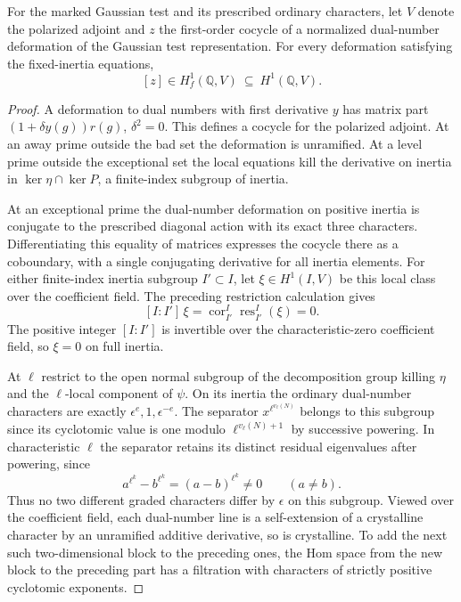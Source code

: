 \begin{lemma}\label{lem:gaussian-fixed-inertia-finite}
For the marked Gaussian test and its prescribed ordinary
characters, let \(V\) denote the polarized adjoint and \(z\) the first-order
cocycle of a normalized dual-number deformation of the Gaussian test
representation. For every deformation satisfying the fixed-inertia equations,
\[
                       [z]\in H_f^1(\mathbb Q,V)
                              \ \subseteq\ H^1(\mathbb Q,V).
\]
\end{lemma}

\begin{proof}
A deformation to dual numbers with first derivative \(y\)
has matrix part \((1+\delta y(g))r(g)\), \(\delta^2=0\).
This defines a cocycle for the polarized adjoint. At an
away prime outside the bad set the deformation is
unramified. At a level prime outside the exceptional set the
local equations kill the derivative on inertia in
\(\ker\eta\cap\ker P\), a finite-index subgroup of inertia.

At an exceptional prime the dual-number deformation on
positive inertia is conjugate to the prescribed diagonal
action with its exact three characters. Differentiating
this equality of matrices expresses the cocycle there
as a coboundary, with a single conjugating derivative
for all inertia elements. For either finite-index inertia subgroup \(I'\subset I\), let
\(\xi\in H^1(I,V)\) be this local class over the coefficient field.
The preceding restriction calculation gives
\[
 [I:I']\,\xi
 =\operatorname{cor}_{I'}^I\operatorname{res}_{I'}^I(\xi)=0 .
\]
The positive integer \([I:I']\) is invertible over the characteristic-zero
coefficient field, so \(\xi=0\) on full inertia.

At \(\ell\) restrict to the open normal subgroup of the
decomposition group killing \(\eta\) and the
\(\ell\)-local component of \(\psi\). On its inertia
the ordinary dual-number characters are exactly
\(\epsilon^{e},1,\epsilon^{-e}\). The separator
\(x^{\ell^{v_\ell(N)}}\) belongs to this subgroup since its
cyclotomic value is one modulo \(\ell^{v_\ell(N)+1}\)
by successive powering. In characteristic \(\ell\) the separator retains its distinct residual eigenvalues after powering, since
\[
 a^{\ell^k}-b^{\ell^k}=(a-b)^{\ell^k}\ne0\qquad(a\ne b).
\] Thus no two different
graded characters differ by \(\epsilon\) on this subgroup.
Viewed over the coefficient field, each dual-number line
is a self-extension of a crystalline character by an
unramified additive derivative, so is crystalline. To
add the next such two-dimensional block to the preceding
ones, the Hom space from the new block to the preceding
part has a filtration with characters of strictly
positive cyclotomic exponents.


\end{proof}
